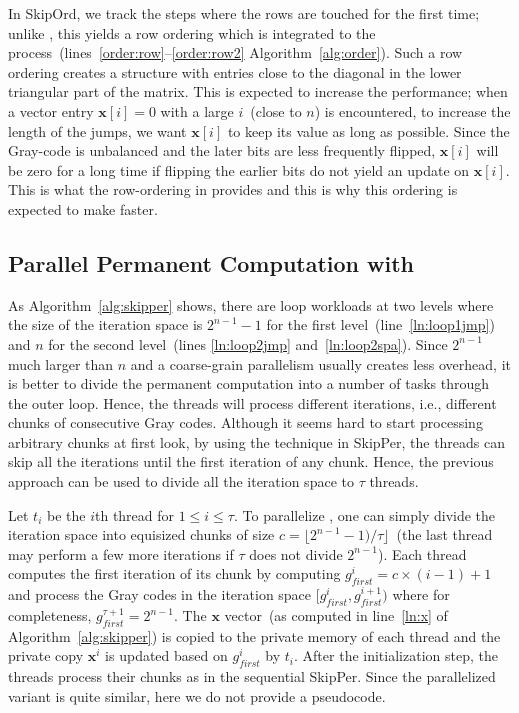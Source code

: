 \documentclass{elektr}
\newcommand{\xb}{\mathbf{x}}
\begin{document}
{In {\sc SkipOrd}, we track the steps where the rows are touched for the first time; unlike {}, this yields a row ordering which is integrated to the process~(lines~\ref{order:row}--\ref{order:row2} Algorithm~\ref{alg:order}). Such a row ordering creates a structure with entries close to the diagonal in the lower triangular part of the matrix. This is expected to increase the performance; when a vector entry $\xb[i] = 0$ with a large $i$~(close to $n$) is encountered, to increase the length of the jumps, we want $\xb[i]$ to keep its value as long as possible. Since the Gray-code is unbalanced and the later bits are less frequently flipped, $\xb[i]$ will be zero for a long time if flipping the earlier bits do not yield an update on $\xb[i]$. This is what the row-ordering in {} provides and this is why this ordering is expected to make {} faster. 

\subsection{Parallel Permanent Computation with {}} \label{sec:par}

As Algorithm~\ref{alg:skipper} shows, there are loop workloads at two levels where the size of the iteration space is $2^{n-1} - 1$ for the first level~(line~\ref{ln:loop1jmp}) and $n$ for the second level~(lines \ref{ln:loop2jmp} and~\ref{ln:loop2spa}). Since $2^{n-1}$ much larger than $n$ and a coarse-grain parallelism usually creates less overhead, it is better to divide the permanent computation into a number of tasks through the outer loop.  Hence, the threads will process different iterations, i.e., different chunks of consecutive Gray codes. Although it seems hard to start processing arbitrary chunks at first look, by using the technique in {\sc SkipPer}, the threads can skip all the iterations until the first iteration of any chunk. Hence, the previous approach can be used to divide all the iteration space to $\tau$ threads.  

Let $t_i$ be the $i$th thread for $1 \leq i \leq \tau$. To parallelize {}, one can simply divide the iteration space into equisized chunks of size $c = \lfloor 2^{n-1} - 1) / \tau \rfloor$~(the last thread may perform a few more iterations if $\tau$ does not divide $2^{n-1}$). Each thread computes the first iteration of its chunk by computing $g^i_{first} = c \times (i-1) + 1$ and process the Gray codes in the iteration space $[g^i_{first}, g^{i+1}_{first})$ where for completeness, $g^{\tau+1}_{first} =  2^{n-1}$. The $\xb$ vector~(as computed in line~\ref{ln:x} of Algorithm~\ref{alg:skipper}) is copied to the private memory of each thread and the private copy $\xb^i$ is updated based on $g^i_{first}$ by $t_i$. After the initialization step, the threads process their chunks as in the sequential {\sc SkipPer}. Since the parallelized variant is quite similar, here we do not provide a pseudocode. 

}
\end{document}
